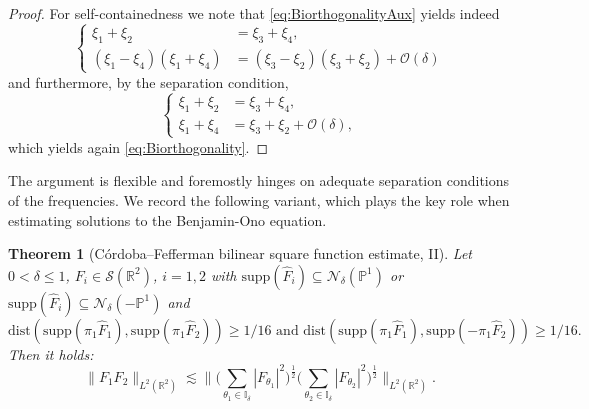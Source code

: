 \documentclass[10pt,a4paper]{amsart}
\newtheorem{theorem}{Theorem}[section]
\newcommand{\R}{\mathbb{R}}
\begin{document}
\begin{proof}
For self-containedness we note that \eqref{eq:BiorthogonalityAux} yields indeed
\begin{equation*}
\left\{ \begin{array}{cl}
\xi_1 + \xi_2 &= \xi_3 + \xi_4, \\
(\xi_1- \xi_4)(\xi_1+\xi_4)  &=  (\xi_3-\xi_2)(\xi_3+\xi_2) + \mathcal{O}(\delta)
\end{array} \right.
\end{equation*}
and furthermore, by the separation condition,
\begin{equation*}
\left\{ \begin{array}{cl}
\xi_1 + \xi_2 &= \xi_3 + \xi_4, \\
\xi_1+\xi_4  &=  \xi_3+\xi_2 + \mathcal{O}(\delta),
\end{array} \right.
\end{equation*}
which yields again \eqref{eq:Biorthogonality}.
\end{proof}

The argument is flexible and foremostly hinges on adequate separation conditions of the frequencies. We record the following variant, which plays the key role when estimating solutions to the Benjamin-Ono equation.


\begin{theorem}[C\'ordoba--Fefferman bilinear square function estimate, II]
\label{thm:SFBO}
Let $0<\delta\leq 1$, $F_i \in \mathcal{S}(\R^2)$, $i=1,2$ with $\text{supp}(\hat{F}_i) \subseteq \mathcal{N}_{\delta}(\mathbb{P}^1)$ or $\text{supp}(\hat{F}_i) \subseteq \mathcal{N}_{\delta}(-\mathbb{P}^1)$ and 
\begin{equation*}
\text{dist}(\text{supp}(\pi_1 \hat{F}_1),\text{supp}(\pi_1 \hat{F}_2)) \geq 1/16 \text{ and }
\text{dist}(\text{supp}(\pi_1 \hat{F}_1),\text{supp}(- \pi_1 \hat{F}_2)) \geq 1/16.
\end{equation*}
Then it holds:
\begin{equation*}
\| F_1 F_2 \|_{L^2(\R^2)} \lesssim \big\| \big( \sum_{\theta_1 \in \mathbb{I}_{\delta}} |F_{\theta_1}|^2 \big)^{\frac{1}{2}} \big( \sum_{\theta_2 \in \mathbb{I}_{\delta}} |F_{\theta_2}|^2 \big)^{\frac{1}{2}} \big\|_{L^2(\R^2)}.
\end{equation*}
\end{theorem}
\end{document}
